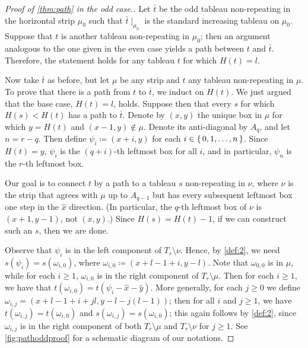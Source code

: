 \documentclass[11pt,reqno]{amsart}
\newcommand*{\restrict}[1]{{\mid}_{#1}}
\theoremstyle{definition}
\theoremstyle{problem}
\theoremstyle{plain}
\theoremstyle{remark}
\theoremstyle{theorem}
\numberwithin{equation}{section}
\numberwithin{figure}{section}
\begin{document}
\begin{proof}[Proof of \cref{thm:path} in the odd case.]
  Let $\bar{t}$ be the odd tableau non-repeating in the horizontal
  strip $\mu_0$ such that $\bar{t}\restrict{\mu_0}$ is the standard
  increasing tableau on $\mu_0$.  Suppose that $t$ is another tableau
  non-repeating in $\mu_0$; then an argument analogous to the one
  given in the even case yields a path between   $t$ and
  $\bar{t}$.  Therefore, the statement holds for any tableau $t$ for which $H(t) = l$.

  Now take $\bar{t}$ as before, but let $\mu$ be any strip and $t$ any
  tableau non-repeating in $\mu$.  To prove that there is a path from
  $t$ to $\bar{t}$, we induct on $H(t)$.  We just argued that the base
  case, $H(t) = l$, holds.  Suppose then that every $s$ for which
  $H(s) < H(t)$ has a path to $\bar{t}$.  Denote by $(x,y)$ the
  unique box in $\mu$ for which $y = H(t)$ and $(x-1,y) \nin \mu$.
  Denote its anti-diagonal by $A_q$, and let $n = r - q$.  Then define
  $\psi_i \coloneq (x+i,y)$ for each $i \in \set{0,1,\ldots,n}$.
  Since $H(t) = y$, $\psi_i$ is the $(q + i)$-th leftmost box for all
  $i$, and in particular, $\psi_n$ is the $r$-th leftmost box.

  Our goal is to connect $t$ by a path to a tableau $s$ non-repeating
  in $\nu$, where $\nu$ is the strip that agrees with $\mu$ up to
  $A_{q-1}$ but has every subsequent leftmost box one step in the
  $\hat x$ direction.  (In particular, the $q$-th leftmost box of
  $\nu$ is $(x+1,y-1)$, not $(x,y)$.)  Since $H(s) = H(t) - 1$, if we
  can construct such an $s$, then we are done.

  Observe that $\psi_i$ is in the left component of
  $T_r \setminus \nu$.  Hence, by \cref{def:2}, we need
  $s(\psi_i) = s(\omega_{i,0})$, where
  $\omega_{i,0} \coloneq (x+l-1+i,y-l)$.  Note that $\omega_{0,0}$ is
  in $\mu$, while for each $i \geq 1$, $\omega_{i,0}$ is in the right
  component of $T_r \setminus \mu$.  Then for each $i \geq 1$, we have
  that $t(\omega_{i,0}) = t(\psi_i - \hat x - \hat y)$.  More
  generally, for each $j \geq 0$ we define
  $\omega_{i,j} = (x+l-1+i+jl,y-l-j(l-1))$; then for all $i$ and
  $j \geq 1$, we have $t(\omega_{i,j}) = t(\omega_{i,0})$ and
  $s(\omega_{i,j}) = s(\omega_{i,0})$; this again follows by
  \cref{def:2}, since $\omega_{i,j}$ is in the right component of both
  $T_r \setminus \mu$ and $T_r \setminus \nu$ for $j \geq 1$.  See
  \cref{fig:pathoddproof} for a schematic diagram of our notations.


\end{proof}
\end{document}
